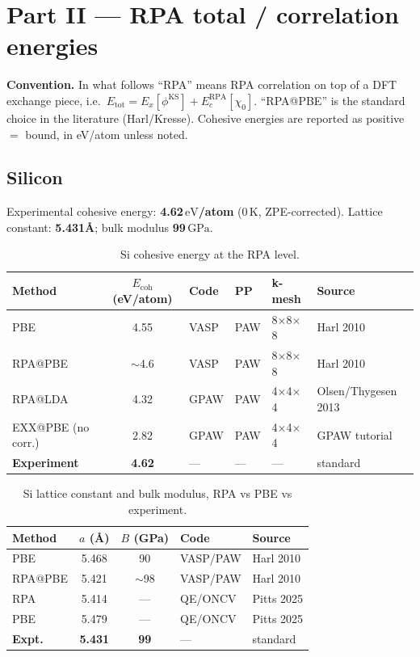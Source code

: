 \documentclass[11pt]{article}
\newcommand{\eV}{\ensuremath{\,\mathrm{eV}}}
\newcommand{\GPa}{\ensuremath{\,\mathrm{GPa}}}
\newcommand{\target}[1]{\textbf{\textcolor{blue!60!black}{#1}}}
\begin{document}
\newpage
\section{Part II --- RPA total / correlation energies}

\textbf{Convention.} In what follows ``RPA'' means RPA correlation on top
of a DFT exchange piece, i.e.\ $E_{\mathrm{tot}} = E_x[\phi^{\mathrm{KS}}]
+ E_c^{\mathrm{RPA}}[\chi_0]$. ``RPA@PBE'' is the standard choice in the
literature (Harl/Kresse). Cohesive energies are reported as positive
$=$ bound, in eV/atom unless noted.

\subsection{Silicon}

Experimental cohesive energy: \target{4.62\eV/atom} (0\,K, ZPE-corrected).
Lattice constant: \target{5.431\AA}; bulk modulus \target{99\GPa}.

\begin{table}[h]
\centering
\caption{Si cohesive energy at the RPA level.}
\label{tab:si_rpa_ecoh}
\small
\begin{tabular}{l c l l l p{4cm}}
\toprule
Method & $E_{\mathrm{coh}}$ (eV/atom) & Code & PP & k-mesh & Source \\
\midrule
PBE                  & 4.55     & VASP  & PAW & 8$\times$8$\times$8 & Harl 2010 \\
RPA@PBE              & $\sim$4.6 & VASP & PAW & 8$\times$8$\times$8 & Harl 2010 \\
RPA@LDA              & 4.32     & GPAW  & PAW & 4$\times$4$\times$4 & Olsen/Thygesen 2013 \\
EXX@PBE (no corr.)   & 2.82     & GPAW  & PAW & 4$\times$4$\times$4 & GPAW tutorial \\
\target{Experiment}  & \target{4.62} & --- & --- & --- & standard \\
\bottomrule
\end{tabular}
\end{table}

\begin{table}[h]
\centering
\caption{Si lattice constant and bulk modulus, RPA vs PBE vs experiment.}
\label{tab:si_rpa_struct}
\small
\begin{tabular}{l c c l l}
\toprule
Method & $a$ (\AA) & $B$ (GPa) & Code & Source \\
\midrule
PBE              & 5.468 & 90    & VASP/PAW   & Harl 2010 \\
RPA@PBE          & 5.421 & $\sim$98 & VASP/PAW & Harl 2010 \\
RPA              & 5.414 & ---   & QE/ONCV    & Pitts 2025 \\
PBE              & 5.479 & ---   & QE/ONCV    & Pitts 2025 \\
\target{Expt.}   & \target{5.431} & \target{99} & --- & standard \\
\bottomrule
\end{tabular}
\end{table}
\end{document}
